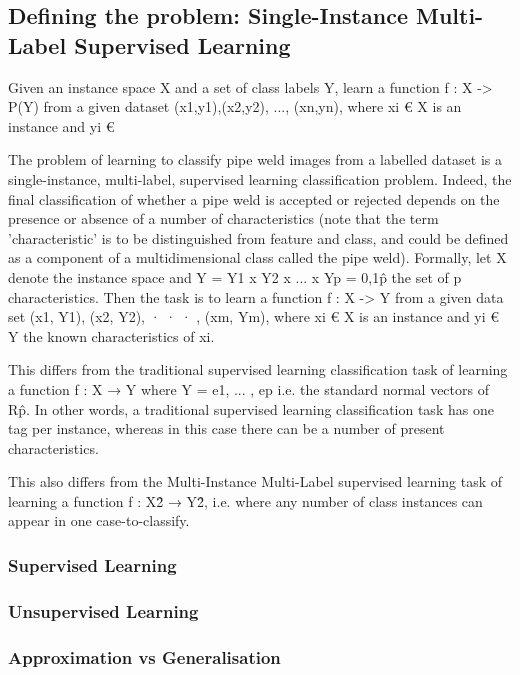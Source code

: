 \documentclass[a4paper,11pt]{article}
\begin{document}
\subsection{Defining the problem: Single-Instance Multi-Label Supervised Learning}

Given an instance space X and a set of class labels Y, learn a function f : X -> P(Y) from a given dataset {(x1,y1),(x2,y2), ..., (xn,yn)}, where xi € X is an instance and yi € 

The problem of learning to classify pipe weld images from a labelled dataset is a single-instance, multi-label, supervised learning classification problem. Indeed, the final classification of whether a pipe weld is accepted or rejected depends on the presence or absence of a number of characteristics (note that the term 'characteristic' is to be distinguished from feature and class, and could be defined as a component of a multidimensional class called the pipe weld). Formally, let X denote the instance space and Y = Y1 x Y2 x ... x Yp = {0,1}\^p the set of p characteristics. Then the task is to learn a function f : X -> Y from a given data set {(x1, Y1), (x2, Y2), · · · , (xm, Ym)}, where xi € X is an instance and yi € Y the known characteristics of xi.

This differs from the traditional supervised learning classification task of learning a function f : X → Y where Y = {e1, ... , ep} i.e. the standard normal vectors of R\^p. In other words, a traditional supervised learning classification task has one tag per instance, whereas in this case there can be a number of present characteristics. 

This also differs from the Multi-Instance Multi-Label supervised learning task of learning a function f : X\^2 → Y\^2, i.e. where any number of class instances can appear in one case-to-classify. 



\subsubsection{Supervised Learning}

\subsubsection{Unsupervised Learning}

\subsubsection{Approximation vs Generalisation}
\end{document}
